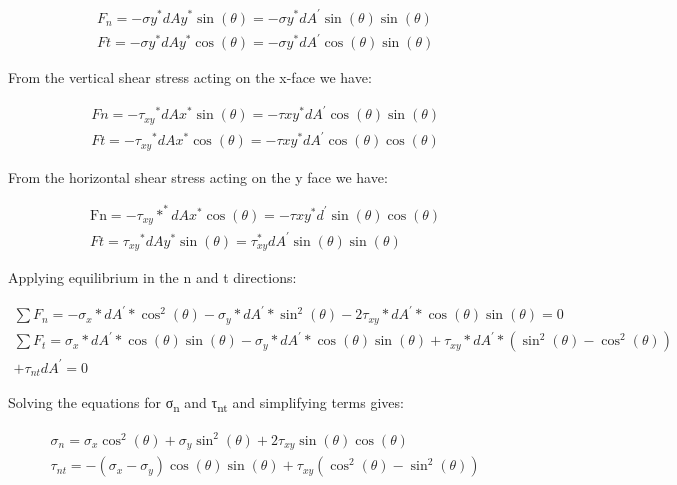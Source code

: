 \documentclass[
  letterpaper,
  DIV=11,
  numbers=noendperiod]{scrreprt}
\begin{document}
\[
\begin{aligned}
& F_n=-\sigma y^* d A y^* \sin (\theta)=-\sigma y^* d A^{\prime} \sin (\theta) \sin (\theta) \\
& F t=-\sigma y^* d A y^* \cos (\theta)=-\sigma y^* d A^{\prime} \cos (\theta) \sin (\theta)
\end{aligned}
\]

From the vertical shear stress acting on the x-face we have:

\[
\begin{aligned}
& F n=-\tau_{xy}{ }^* d A x^* \sin (\theta)=-\tau x y^* d A^{\prime} \cos (\theta) \sin (\theta) \\
& F t=-\tau_{xy}{ }^* d A x^* \cos (\theta)=-\tau x y^* d A^{\prime} \cos (\theta) \cos (\theta)
\end{aligned}
\]

From the horizontal shear stress acting on the y face we have:

\[
\begin{aligned}
& \mathrm{Fn}=-\tau_{xy} *^* d A x^* \cos (\theta)=-\tau x y^* d^{\prime} \sin (\theta) \cos (\theta) \\
& F t=\tau_{xy}{ }^* d A y^* \sin (\theta)=\tau_{x y}^* d A^{\prime} \sin (\theta) \sin (\theta)
\end{aligned}
\]

Applying equilibrium in the n and t directions:

\[
\begin{gathered}
\sum F_n=-\sigma_x * d A^{\prime} * \cos ^2(\theta)-\sigma_y * d A^{\prime} * \sin ^2(\theta)-2 \tau_{x y} * d A^{\prime} * \cos (\theta) \sin (\theta)=0 \\
\sum F_t=\sigma_x * d A^{\prime} * \cos (\theta) \sin (\theta)-\sigma_y * d A^{\prime} * \cos (\theta) \sin (\theta)+\tau_{x y} * d A^{\prime} *\left(\sin ^2(\theta)-\cos ^2(\theta)\right) \\
+\tau_{n t} d A^{\prime}=0
\end{gathered}
\]

Solving the equations for σ\textsubscript{n} and τ\textsubscript{nt} and
simplifying terms gives:

\[
\begin{aligned}
& \sigma_n=\sigma_x \cos ^2(\theta)+\sigma_y \sin ^2(\theta)+2 \tau_{x y} \sin (\theta) \cos (\theta) \\
& \tau_{n t}=-\left(\sigma_x-\sigma_y\right) \cos (\theta) \sin (\theta)+\tau_{x y}\left(\cos ^2(\theta)-\sin ^2(\theta)\right)
\end{aligned}
\]
\end{document}
